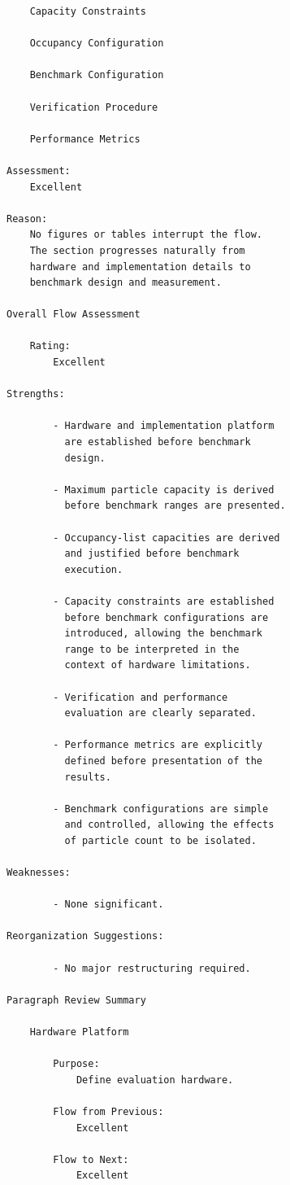 \begin{verbatim}
    Capacity Constraints

    Occupancy Configuration

    Benchmark Configuration

    Verification Procedure

    Performance Metrics

Assessment:
    Excellent

Reason:
    No figures or tables interrupt the flow.
    The section progresses naturally from
    hardware and implementation details to
    benchmark design and measurement.

Overall Flow Assessment

    Rating:
        Excellent

Strengths:

        - Hardware and implementation platform
          are established before benchmark
          design.

        - Maximum particle capacity is derived
          before benchmark ranges are presented.

        - Occupancy-list capacities are derived
          and justified before benchmark
          execution.

        - Capacity constraints are established
          before benchmark configurations are
          introduced, allowing the benchmark
          range to be interpreted in the
          context of hardware limitations.

        - Verification and performance
          evaluation are clearly separated.

        - Performance metrics are explicitly
          defined before presentation of the
          results.

        - Benchmark configurations are simple
          and controlled, allowing the effects
          of particle count to be isolated.

Weaknesses:

        - None significant.

Reorganization Suggestions:

        - No major restructuring required.

Paragraph Review Summary

    Hardware Platform

        Purpose:
            Define evaluation hardware.

        Flow from Previous:
            Excellent

        Flow to Next:
            Excellent


\end{verbatim}
